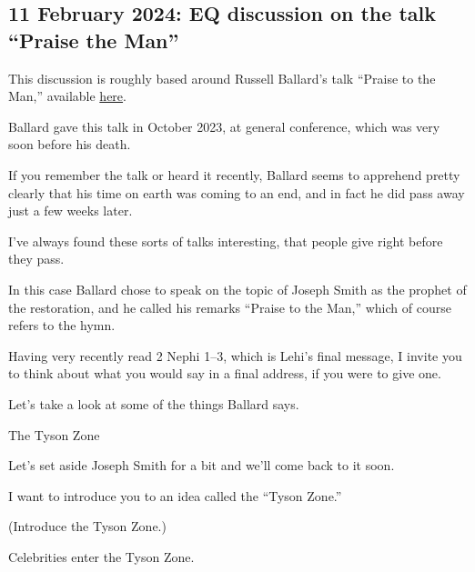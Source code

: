 	\subsection{11 February 2024: EQ discussion on the talk ``Praise the Man''}
		\label{TALKS-02-11-2024}
		
		This discussion is roughly based around Russell Ballard's talk ``Praise to the Man,'' available \href{https://www.churchofjesuschrist.org/study/general-conference/2023/10/41ballard?lang=eng}{here}.
		
		\begin{compactitem}
		
			\item Ballard gave this talk in October 2023, at general conference, which was very soon before his death.
				\begin{compactitem}
					\item If you remember the talk or heard it recently, Ballard seems to apprehend pretty clearly that his time on earth was coming to an end, and in fact he did pass away just a few weeks later.
					\item I've always found these sorts of talks interesting, that people give right before they pass.
					\item In this case Ballard chose to speak on the topic of Joseph Smith as the prophet of the restoration, and he called his remarks ``Praise to the Man,'' which of course refers to the hymn.
					\item Having very recently read 2 Nephi 1--3, which is Lehi's final message, I invite you to think about what you would say in a final address, if you were to give one.
					\item Let's take a look at some of the things Ballard says.
				\end{compactitem}
				
			\item The Tyson Zone
				\begin{compactitem}
					\item Let's set aside Joseph Smith for a bit and we'll come back to it soon.
					\item I want to introduce you to an idea called the ``Tyson Zone.''
					\item (Introduce the Tyson Zone.)
					\item Celebrities enter the Tyson Zone.
				\end{compactitem}
				

\end{compactitem}
